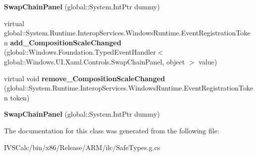 \begin{DoxyCompactItemize}
\item 
\mbox{\label{class_windows_1_1_u_i_1_1_xaml_1_1_controls_1_1_swap_chain_panel_a6de3689912620c444d7d52113f389d56}} 
{\bfseries Swap\+Chain\+Panel} (global\+::\+System.\+Int\+Ptr dummy)
\item 
\mbox{\label{class_windows_1_1_u_i_1_1_xaml_1_1_controls_1_1_swap_chain_panel_a1e9bf0904d5c5eb2ae257878d54180b3}} 
virtual global\+::\+System.\+Runtime.\+Interop\+Services.\+Windows\+Runtime.\+Event\+Registration\+Token {\bfseries add\+\_\+\+Composition\+Scale\+Changed} (global\+::\+Windows.\+Foundation.\+Typed\+Event\+Handler$<$ global\+::\+Windows.\+U\+I.\+Xaml.\+Controls.\+Swap\+Chain\+Panel, object $>$ value)
\item 
\mbox{\label{class_windows_1_1_u_i_1_1_xaml_1_1_controls_1_1_swap_chain_panel_a50e6f6e6ea2dc3470be06877f3ac04b8}} 
virtual void {\bfseries remove\+\_\+\+Composition\+Scale\+Changed} (global\+::\+System.\+Runtime.\+Interop\+Services.\+Windows\+Runtime.\+Event\+Registration\+Token token)
\item 
\mbox{\label{class_windows_1_1_u_i_1_1_xaml_1_1_controls_1_1_swap_chain_panel_a6de3689912620c444d7d52113f389d56}} 
{\bfseries Swap\+Chain\+Panel} (global\+::\+System.\+Int\+Ptr dummy)
\end{DoxyCompactItemize}


The documentation for this class was generated from the following file\+:\begin{DoxyCompactItemize}
\item 
I\+V\+S\+Calc/bin/x86/\+Release/\+A\+R\+M/ilc/Safe\+Types.\+g.\+cs\end{DoxyCompactItemize}
